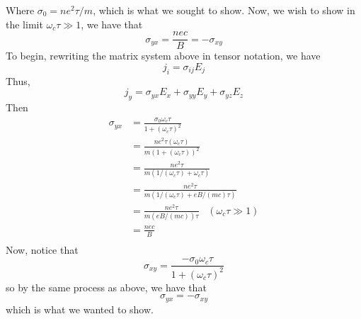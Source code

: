 \documentclass{article}
\begin{document}
Where $\sigma_0 = ne^2\tau/m$, which is what we sought to show. 
\newline\newline
Now, we wish to show in the limit $\omega_c\tau \gg 1$, we have that
\[\sigma_{yx} = \frac{nec}{B} = -\sigma_{xy}\]
To begin, rewriting the matrix system above in tensor notation, we have
\[j_{i} = \sigma_{ij}E_j\]
Thus, 
\[j_{y} = \sigma_{yx}E_x + \sigma_{yy}E_y + \sigma_{yz}E_z\]
Then 
\begin{align*}
    \sigma_{yx} &= \frac{\sigma_0\omega_c\tau}{1 + (\omega_c\tau)^2} \\
    &= \frac{ne^2\tau(\omega_c\tau)}{m(1 + (\omega_c\tau))^2} \\
    &= \frac{ne^2\tau}{m(1/(\omega_c\tau) + \omega_c\tau)} \\
    &= \frac{ne^2\tau}{m(1/(\omega_c\tau)+eB/(mc)\tau)} \\
    &= \frac{ne^2\tau}{m(eB/(mc))\tau} \;\;\; (\omega_c\tau \gg 1)\\
    &= \frac{nec}{B} \\
\end{align*}
Now, notice that
\[\sigma_{xy} = \frac{-\sigma_0\omega_c\tau}{1 + (\omega_c\tau)^2}\]
so by the same process as above, we have that 
\[\sigma_{yx} = -\sigma_{xy}\]
which is what we wanted to show.
\end{document}
